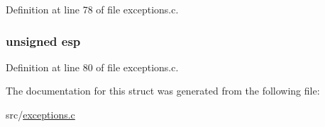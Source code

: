 Definition at line 78 of file exceptions.c.

\hypertarget{structregisters_ae5fca9ad9630a49d43dc822c7c36b795}{
\subsubsection[{esp}]{\setlength{\rightskip}{0pt plus 5cm}unsigned {\bf esp}}}
\label{structregisters_ae5fca9ad9630a49d43dc822c7c36b795}


Definition at line 80 of file exceptions.c.



The documentation for this struct was generated from the following file:\begin{DoxyCompactItemize}
\item 
src/\hyperlink{exceptions_8c}{exceptions.c}\end{DoxyCompactItemize}

